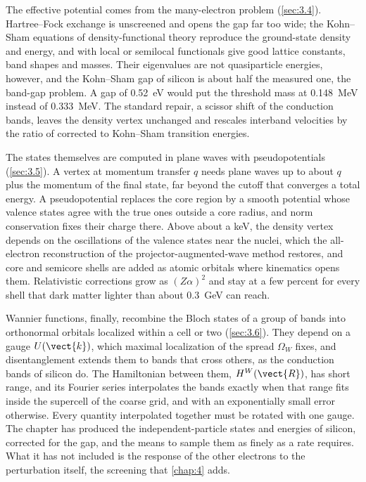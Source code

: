 The effective potential comes from the many-electron problem (\cref{sec:3.4}). Hartree--Fock exchange is unscreened and opens the gap far too wide; the Kohn--Sham equations of density-functional theory reproduce the ground-state density and energy, and with local or semilocal functionals give good lattice constants, band shapes and masses. Their eigenvalues are not quasiparticle energies, however, and the Kohn--Sham gap of silicon is about half the measured one, the band-gap problem. A gap of \SI{0.52}{eV} would put the threshold mass at \SI{0.148}{MeV} instead of \SI{0.333}{MeV}. The standard repair, a scissor shift of the conduction bands, leaves the density vertex unchanged and rescales interband velocities by the ratio of corrected to Kohn--Sham transition energies.

The states themselves are computed in plane waves with pseudopotentials (\cref{sec:3.5}). A vertex at momentum transfer $q$ needs plane waves up to about $q$ plus the momentum of the final state, far beyond the cutoff that converges a total energy. A pseudopotential replaces the core region by a smooth potential whose valence states agree with the true ones outside a core radius, and norm conservation fixes their charge there. Above about a keV, the density vertex depends on the oscillations of the valence states near the nuclei, which the all-electron reconstruction of the projector-augmented-wave method restores, and core and semicore shells are added as atomic orbitals where kinematics opens them. Relativistic corrections grow as $(Z\alpha)^2$ and stay at a few percent for every shell that dark matter lighter than about \SI{0.3}{GeV} can reach.

Wannier functions, finally, recombine the Bloch states of a group of bands into orthonormal orbitals localized within a cell or two (\cref{sec:3.6}). They depend on a gauge $U(\vect{k})$, which maximal localization of the spread $\Omega_W$ fixes, and disentanglement extends them to bands that cross others, as the conduction bands of silicon do. The Hamiltonian between them, $H^W(\vect{R})$, has short range, and its Fourier series interpolates the bands exactly when that range fits inside the supercell of the coarse grid, and with an exponentially small error otherwise. Every quantity interpolated together must be rotated with one gauge. The chapter has produced the independent-particle states and energies of silicon, corrected for the gap, and the means to sample them as finely as a rate requires. What it has not included is the response of the other electrons to the perturbation itself, the screening that \cref{chap:4} adds.
